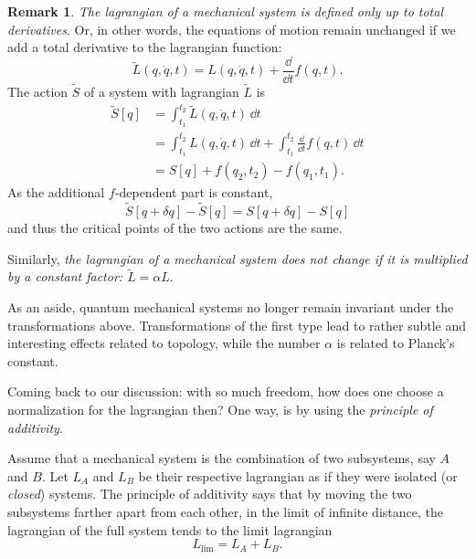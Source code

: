 \documentclass[english,fontsize=11pt,paper=b5]{scrbook}
\theoremstyle{definition}
\newtheorem{remark}{Remark}[chapter]
\begin{document}
    \begin{remark}\label{rmk:manylagrangians}
      \emph{The lagrangian of a mechanical system is defined only up to total derivatives}.
      Or, in other words, the equations of motion remain unchanged if we add a total derivative to the lagrangian function:
      \begin{equation}
        \widetilde L(q,\dot q, t) = L(q, \dot q, t) + \frac{\dd}{\dd t} f(q,t).
      \end{equation}
      The action $\widetilde S$ of a system with lagrangian $\widetilde L$ is
      \begin{align}
        \widetilde S[q] & = \int_{t_1}^{t_2} \widetilde L(q, \dot q, t) \,\dd t                                       \\
                        & = \int_{t_1}^{t_2} L(q, \dot q, t) \,\dd t + \int_{t_1}^{t_2} \frac{\dd}{\dd t} f(q,t) \,\dd t \\
                        & = S[q] + f(q_2, t_2) - f(q_1, t_1).
      \end{align}
      As the additional $f$-dependent part is constant,
      \begin{equation}
        \widetilde S[q+\delta q] - \widetilde S[q]
        = S[q+\delta q] - S[q]
      \end{equation}
      and thus the critical points of the two actions are the same.

      Similarly, \emph{the lagrangian of a mechanical system does not change if it is multiplied by a constant factor: $\widetilde L = \alpha L$}.

      As an aside, quantum mechanical systems no longer remain invariant under the transformations above. Transformations of the first type lead to rather subtle and interesting effects related to topology, while the number $\alpha$ is related to Planck's constant.
    \end{remark}

    Coming back to our discussion: with so much freedom, how does one choose a normalization for the lagrangian then?
    One way, is by using the \emph{principle of additivity}.
    \begin{tcolorbox}
      Assume that a mechanical system is the combination of two subsystems, say $A$ and $B$.
      Let $L_A$ and $L_B$ be their respective lagrangian as if they were isolated (or \emph{closed}) systems.
      The principle of additivity says that by moving the two subsystems farther apart from each other, in the limit of infinite distance, the lagrangian of the full system tends to the limit lagrangian
      \begin{equation}
        L_{\lim} = L_A + L_B.
      \end{equation}
    \end{tcolorbox}
\end{document}
